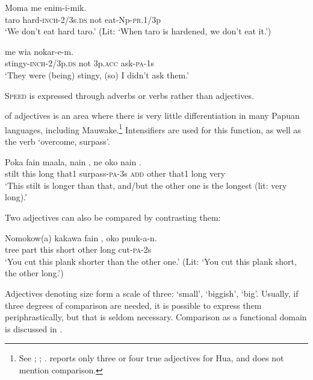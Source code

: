 \ea%
\label{ex:3:x79}
\gll Moma   me enim-i-mik. \\
taro hard-\textsc{inch}-2/3s.\textsc{ds} not eat-Np-\textsc{pr}.1/3p\\
\glt`We don't eat hard taro.' (Lit: `When taro is hardened, we don't eat it.')
\z

\ea%
\label{ex:3:x80}
\gll {} me wia nokar-e-m. \\
stingy-\textsc{inch}-2/3p.\textsc{ds} not 3p.\textsc{acc} ask-\textsc{pa}-1s\\
\glt`They were (being) stingy, (so) I didn't ask them.'
\z

\textsc{Speed} is expressed through adverbs or verbs rather than adjectives.

 of adjectives is an area where there is very little differentiation in many Papuan languages, including Mauwake.\footnote{See \citet[134--135]{Roberts1987}; \citet[68]{Reesink1987}; \citet[63--64]{Hardin2002}. \citet[268]{Haiman1980} reports only three or four true adjectives for Hua, and does not mention comparison.} Intensifiers are used for this function, as well as the verb  `overcome, surpass'. 

\ea%
\label{ex:3:x81}
\gll Poka fain maala, nain , ne oko nain  .\\
stilt this long that1 surpass-\textsc{pa}-3s \textsc{add} other that1 long very\\
\glt`This stilt is longer than that, and/but the other one is the longest (lit: very long).'
\z

Two adjectives can also be compared by contrasting them: 

\ea%
\label{ex:3:x441}
\gll Nomokow(a) kakawa fain , oko  puuk-a-n. \\
tree part this short other long cut-\textsc{pa}-2s\\
\glt`You cut this plank shorter than the other one.' (Lit: `You cut this plank short, the other long.')
\z

Adjectives denoting size form a scale of three:  `small',  `biggish',  `big'. Usually, if three degrees of comparison are needed, it is possible to express them periphrastically, but that is seldom necessary. Comparison as a functional domain is discussed in . 

